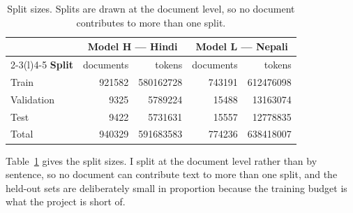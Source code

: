\documentclass[10pt,a4paper]{article}
\begin{document}
\begin{table}[htbp]
\centering\small
\begin{tabular}{@{}l r r@{\hskip 20pt} r r@{}}
\toprule
 & \multicolumn{2}{c}{\textbf{Model H --- Hindi}} & \multicolumn{2}{c}{\textbf{Model L --- Nepali}} \\
\cmidrule(r){2-3}\cmidrule(l){4-5}
\textbf{Split} & documents & tokens & documents & tokens \\
\midrule
Train      & \num{921582} & \num{580162728} & \num{743191} & \num{612476098} \\
Validation & \num{9325}   & \num{5789224}   & \num{15488}  & \num{13163074} \\
Test       & \num{9422}   & \num{5731631}   & \num{15557}  & \num{12778835} \\
\midrule
Total      & \num{940329} & \num{591683583} & \num{774236} & \num{638418007} \\
\bottomrule
\end{tabular}
\caption{Split sizes. Splits are drawn at the document level, so no document contributes to more than one split.}
\label{tab:splits}
\end{table}

Table~\ref{tab:splits} gives the split sizes. I split at the document level
rather than by sentence, so no document can contribute text to more than one
split, and the held-out sets are deliberately small in proportion because the
training budget is what the project is short of.
\end{document}
